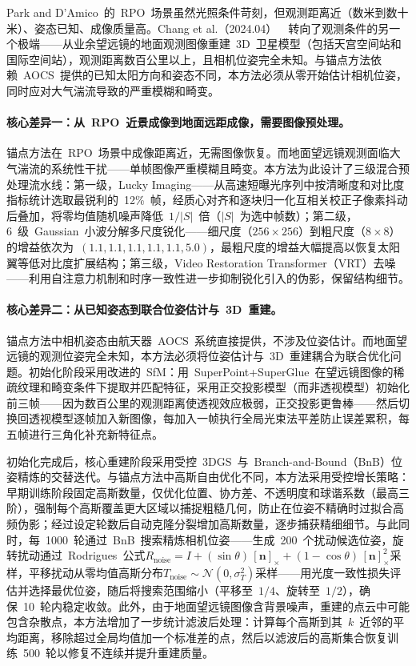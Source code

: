 Park and D'Amico~的~RPO~场景虽然光照条件苛刻，但观测距离近（数米到数十米）、姿态已知、成像质量高。Chang et al.（2024.04）~\cite{2404_18394}~转向了观测条件的另一个极端——从业余望远镜的地面观测图像重建~3D~卫星模型（包括天宫空间站和国际空间站），观测距离数百公里以上，且相机位姿完全未知。与锚点方法依赖~AOCS~提供的已知太阳方向和姿态不同，本方法必须从零开始估计相机位姿，同时应对大气湍流导致的严重模糊和畸变。

\paragraph{核心差异一：从~RPO~近景成像到地面远距成像，需要图像预处理。}
锚点方法在~RPO~场景中成像距离近，无需图像恢复。而地面望远镜观测面临大气湍流的系统性干扰——单帧图像严重模糊且畸变。本方法为此设计了三级混合预处理流水线：第一级，Lucky Imaging——从高速短曝光序列中按清晰度和对比度指标统计选取最锐利的~12\%~帧，经质心对齐和逐块归一化互相关校正子像素抖动后叠加，将零均值随机噪声降低~$1/|S|$~倍（$|S|$~为选中帧数）；第二级，6~级~Gaussian~小波分解多尺度锐化——细尺度（$256 \times 256$）到粗尺度（$8 \times 8$）的增益依次为~$(1.1, 1.1, 1.1, 1.1, 1.1, 5.0)$，最粗尺度的增益大幅提高以恢复太阳翼等低对比度扩展结构；第三级，Video Restoration Transformer（VRT）去噪——利用自注意力机制和时序一致性进一步抑制锐化引入的伪影，保留结构细节。

\paragraph{核心差异二：从已知姿态到联合位姿估计与~3D~重建。}
锚点方法中相机姿态由航天器~AOCS~系统直接提供，不涉及位姿估计。而地面望远镜的观测位姿完全未知，本方法必须将位姿估计与~3D~重建耦合为联合优化问题。初始化阶段采用改进的~SfM：用~SuperPoint+SuperGlue~在望远镜图像的稀疏纹理和畸变条件下提取并匹配特征，采用正交投影模型（而非透视模型）初始化前三帧——因为数百公里的观测距离使透视效应极弱，正交投影更鲁棒——然后切换回透视模型逐帧加入新图像，每加入一帧执行全局光束法平差防止误差累积，每五帧进行三角化补充新特征点。

初始化完成后，核心重建阶段采用受控~3DGS~与~Branch-and-Bound（BnB）位姿精炼的交替迭代。与锚点方法中高斯自由优化不同，本方法采用受控增长策略：早期训练阶段固定高斯数量，仅优化位置、协方差、不透明度和球谐系数（最高三阶），强制每个高斯覆盖更大区域以捕捉粗糙几何，防止在位姿不精确时过拟合高频伪影；经过设定轮数后自动克隆分裂增加高斯数量，逐步捕获精细细节。与此同时，每~1000~轮通过~BnB~搜索精炼相机位姿——生成~200~个扰动候选位姿，旋转扰动通过~Rodrigues~公式$R_{\text{noise}} = I + (\sin\theta)\,[\mathbf{n}]_\times + (1 - \cos\theta)\,[\mathbf{n}]_\times^2$采样，平移扰动从零均值高斯分布$T_{\text{noise}} \sim \mathcal{N}(0, \sigma_T^2)$采样——用光度一致性损失评估并选择最优位姿，随后将搜索范围缩小（平移至~$1/4$、旋转至~$1/2$），确保~10~轮内稳定收敛。此外，由于地面望远镜图像含背景噪声，重建的点云中可能包含杂散点，本方法增加了一步统计滤波后处理：计算每个高斯到其~$k$~近邻的平均距离，移除超过全局均值加一个标准差的点，然后以滤波后的高斯集合恢复训练~500~轮以修复不连续并提升重建质量。

